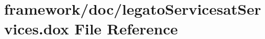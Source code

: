 \hypertarget{legato_servicesat_services_8dox}{}\section{framework/doc/legato\+Servicesat\+Services.dox File Reference}
\label{legato_servicesat_services_8dox}

